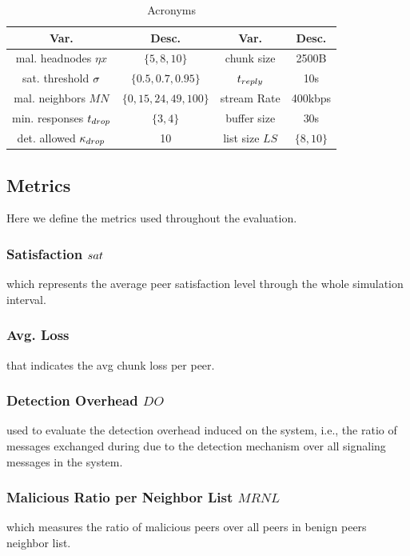 \begin{table}[ht]
\center
\caption{Acronyms}
\begin{tabular}{|c|c||c|c|}
\hline

\bf{Var.} & \bf{Desc.}  & \bf{Var.} & \bf{Desc.} \\\hline\hline

mal. headnodes $\eta x$ & $\{5,8,10\}$ & chunk size & 2500B \\\hline
sat. threshold $\sigma$ & $\{0.5,0.7,0.95\}$ & $t_{reply}$ & 10s\\\hline
mal. neighbors $MN$  & $\{0,15,24,49,100\}$ & stream Rate & 400kbps\\\hline
min. responses $t_{drop}$ &  $\{3,4\}$ & buffer size & 30s  \\\hline
det. allowed $\kappa_{drop}$ & 10 & list size $LS$ & $\{8,10\}$\\\hline
  
\end{tabular}
\label{tab:parameters}
\end{table}

\subsection{Metrics}

Here we define the metrics used throughout the evaluation.
\subsubsection*{Satisfaction $sat$} which represents the average peer satisfaction level through the whole simulation interval.
\subsubsection*{Avg. Loss} that indicates the avg chunk loss per peer.
\subsubsection*{Detection Overhead $DO$} used to evaluate the detection overhead induced on the system, i.e., the ratio of messages exchanged during due to the detection mechanism over all signaling messages in the system.
\subsubsection*{Malicious Ratio per Neighbor List $MRNL$} which measures the ratio of malicious peers over all peers in benign peers neighbor list.

